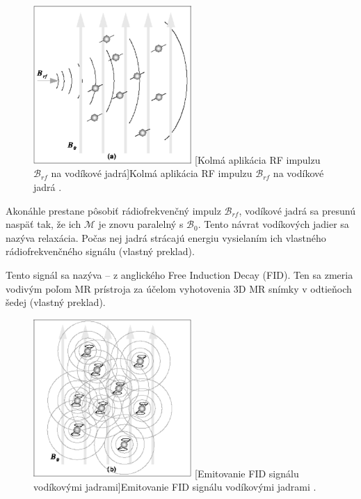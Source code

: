 \begin {figure}[H]
        \centering
        \includegraphics[height=6cm]{media/hydrogen/hydrogen_reacting_to_rf.png}
        \captionsetup{justification=centering}
        [Kolmá aplikácia RF impulzu $\mathcal{B}_{rf}$ na vodíkové jadrá]{Kolmá aplikácia RF impulzu $\mathcal{B}_{rf}$ na vodíkové jadrá \cite{basic_principles_of_mri}.}
\end {figure}

Akonáhle prestane pôsobiť rádiofrekvenčný impulz $\mathcal{B}_{rf}$, vodíkové jadrá sa presunú naspäť tak, že ich $\mathcal{M}$ je znovu paralelný s $\mathcal{B}_{0}$. Tento návrat vodíkových jadier sa nazýva relaxácia. Počas nej jadrá strácajú energiu vysielaním ich vlastného rádiofrekvenčného signálu  \cite{basic_principles_of_mri} (vlastný preklad).

Tento signál sa nazýva  -- z anglického Free Induction Decay (FID). Ten sa zmeria vodivým poľom MR prístroja za účelom vyhotovenia 3D MR snímky v odtieňoch šedej \cite{basic_principles_of_mri} (vlastný preklad).

\begin {figure}[H]
        \centering
        \includegraphics[height=6cm]{media/hydrogen/hydrogen_emitting_rf.png}
        \captionsetup{justification=centering}
        [Emitovanie FID signálu vodíkovými jadrami]{Emitovanie FID signálu vodíkovými jadrami \cite{basic_principles_of_mri}.}
\end {figure}

